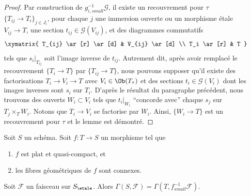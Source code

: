 \begin{proof}
\medskip\noindent
Par construction de $g_{i, small}^{-1}\mathcal{G}$, il existe
un recouvrement pour $\tau$ $\{T_{ij} \to T_i\}_{j \in J_i}$, pour chaque $j$ une
immersion ouverte ou un morphisme \'etale $V_{ij} \to T$, une section
$t_{ij} \in \mathcal{G}(V_{ij})$, et des diagrammes commutatifs
$$
\xymatrix{
T_{ij} \ar[r] \ar[d] & V_{ij} \ar[d] \\
T_i \ar[r] & T
}
$$
tels que $s_i|_{T_{ij}}$ soit l'image inverse de $t_{ij}$. Autrement dit,
apr\`es avoir remplac\'e le recouvrement $\{T_i \to T\}$ par $\{T_{ij} \to T\}$,
nous pouvons supposer qu'il existe des factorisations $T_i \to V_i \to T$ avec
$V_i \in \Ob(T_\tau)$ et des sections $t_i \in \mathcal{G}(V_i)$
dont les images inverses sont $s_i$ sur $T_i$.
D'apr\`es le r\'esultat du paragraphe pr\'ec\'edent, nous trouvons des ouverts $W_i \subset V_i$
tels que $t_i|_{W_i}$ ``concorde avec'' chaque $s_j$ sur $T_j \times_T W_i$.
Notons que $T_i \to V_i$ se factorise par $W_i$.
Ainsi, $\{W_i \to T\}$ est un recouvrement pour $\tau$ et le lemme est d\'emontr\'e.
\end{proof}

\begin{lemma}
\label{lemma-sections-upstairs}
Soit $S$ un sch\'ema. Soit $f : T \to S$ un morphisme tel que
\begin{enumerate}
\item $f$ est plat et quasi-compact, et
\item les fibres g\'eom\'etriques de $f$ sont connexes.
\end{enumerate}
Soit $\mathcal{F}$ un faisceau sur $S_\etale$.
Alors $\Gamma(S, \mathcal{F}) = \Gamma(T, f^{-1}_{small}\mathcal{F})$.
\end{lemma}

